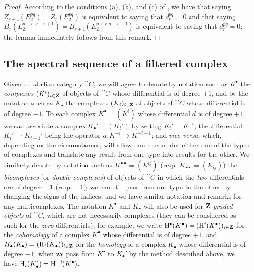 \begin{proof}
According to the conditions (a), (b), and (c) of , we have that saying $Z_{r+1}(E_2^{pq})=Z_r(E_2^{pq})$ is equivalent to saying that $d_r^{pq}=0$ and that saying $B_r(E_2^{p+r,q-r+1})=B_{r+1}(E_2^{p+r,q-r+1})$ is equivalent to saying that $d_r^{pq}=0$; the lemma immediately follows from this remark.
\end{proof}

\subsection{The spectral sequence of a filtered complex}
\label{subsection:0.11.2}

\begin{env}[11.2.1]
\label{0.11.2.1}
Given an abelian category $\cat{C}$, we will agree to denote by notation such as $K^\bullet$ the \emph{complexes $(K^i)_{i\in\mathbf{Z}}$} of objects of $\cat{C}$ whose differential is of degree $+1$, and by the notation such as $K_\bullet$ the complexes $(K_i)_{i\in\mathbf{Z}}$ of objects of $\cat{C}$ whose differential is of degree $-1$.
To each complex $K^\bullet=(K^i)$ whose differential $d$ is of degree $+1$, we can associate a complex $K_\bullet'=(K_i')$ by setting $K_i'=K^{-i}$, the differential $K_i'\to K_{i-1}'$ being the operator $d:K^{-i}\to K^{-i-1}$; and \emph{vice versa}, which, depending on the circumstances, will allow one to consider either one of the types of complexes and translate  any result from one type into results for the other.
We similarly denote by notation such as $K^{\bullet\bullet}=(K^{ij})$ (resp. $K_{\bullet\bullet}=(K_{ij})$) the \emph{bicomplexes} (or \emph{double complexes}) of objects of $\cat{C}$ in which the \emph{two} differentials are of degree $+1$ (resp. $-1$); we can still pass from one type to the other by changing the signs of the indices, and we have similar notation and remarks for any multicomplexes.
The notation $K^\bullet$ and $K_\bullet$ will also be used for \emph{$\mathbf{Z}$-graded objects} of $\cat{C}$, which are not necessarily complexes (they can be considered as such for the \emph{zero} differentials); for example, we write $\mathrm{H}^\bullet(K^\bullet)=(\mathrm{H}^i(K^\bullet))_{i\in\mathbf{Z}}$ for the \emph{cohomology} of a complex $K^\bullet$ whose differential is of degree $+1$, and $H_\bullet(K_\bullet)=(\mathrm{H}_i(K_\bullet))_{i\in\mathbf{Z}}$ for the \emph{homology} of a complex $K_\bullet$ whose differential is of degree $-1$; when we pass from $K^\bullet$ to $K_\bullet'$ by the method described above, we have $\mathrm{H}_i(K_\bullet')=\mathrm{H}^{-i}(K^\bullet)$.


\end{env}
